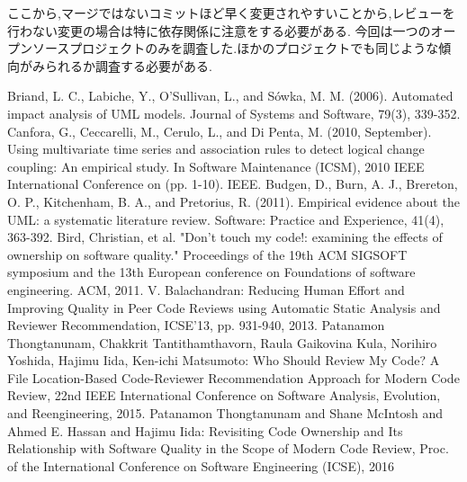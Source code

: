\documentclass[submit,ses,noauthor]{ipsj} %
\begin{document}
ここから,マージではないコミットほど早く変更されやすいことから,レビューを行わない変更の場合は特に依存関係に注意をする必要がある.
今回は一つのオープンソースプロジェクトのみを調査した.ほかのプロジェクトでも同じような傾向がみられるか調査する必要がある.



\begin{thebibliography}{10}
Briand, L. C., Labiche, Y., O’Sullivan, L., and Sówka, M. M. (2006). Automated impact analysis of UML models. Journal of Systems and Software, 79(3), 339-352.
 Canfora, G., Ceccarelli, M., Cerulo, L., and Di Penta, M. (2010, September). Using multivariate time series and association rules to detect logical change coupling: An empirical study. In Software Maintenance (ICSM), 2010 IEEE International Conference on (pp. 1-10). IEEE.
Budgen, D., Burn, A. J., Brereton, O. P., Kitchenham, B. A., and Pretorius, R. (2011). Empirical evidence about the UML: a systematic literature review. Software: Practice and Experience, 41(4), 363-392.
Bird, Christian, et al. "Don't touch my code!: examining the effects of ownership on software quality." Proceedings of the 19th ACM SIGSOFT symposium and the 13th European conference on Foundations of software engineering. ACM, 2011.
V. Balachandran: Reducing Human Effort and Improving Quality in Peer Code Reviews using Automatic Static Analysis and Reviewer Recommendation, ICSE'13, pp. 931-940, 2013.
Patanamon Thongtanunam, Chakkrit Tantithamthavorn, Raula Gaikovina Kula, Norihiro Yoshida, Hajimu Iida, Ken-ichi Matsumoto: Who Should Review My Code? A File Location-Based Code-Reviewer Recommendation Approach for Modern Code Review, 22nd IEEE International Conference on Software Analysis, Evolution, and Reengineering, 2015.
Patanamon Thongtanunam and Shane McIntosh and Ahmed E. Hassan and Hajimu Iida: Revisiting Code Ownership and Its Relationship with Software Quality in the Scope of Modern Code Review, Proc. of the International Conference on Software Engineering (ICSE), 2016
 \end{thebibliography}
\end{document}
